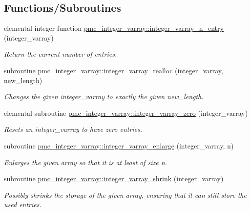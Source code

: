 \subsection*{Functions/\+Subroutines}
\begin{DoxyCompactItemize}
\item 
elemental integer function \mbox{\hyperlink{namespacepmc__integer__varray_aac024cead9772e37f130bdc79254cdd5}{pmc\+\_\+integer\+\_\+varray\+::integer\+\_\+varray\+\_\+n\+\_\+entry}} (integer\+\_\+varray)
\begin{DoxyCompactList}\small\item\em Return the current number of entries. \end{DoxyCompactList}\item 
subroutine \mbox{\hyperlink{namespacepmc__integer__varray_a56e39f9ee34a4092a5c32b74b85494bc}{pmc\+\_\+integer\+\_\+varray\+::integer\+\_\+varray\+\_\+realloc}} (integer\+\_\+varray, new\+\_\+length)
\begin{DoxyCompactList}\small\item\em Changes the given integer\+\_\+varray to exactly the given new\+\_\+length. \end{DoxyCompactList}\item 
elemental subroutine \mbox{\hyperlink{namespacepmc__integer__varray_a374e54ec508c92316da539cb8f0d8a0f}{pmc\+\_\+integer\+\_\+varray\+::integer\+\_\+varray\+\_\+zero}} (integer\+\_\+varray)
\begin{DoxyCompactList}\small\item\em Resets an integer\+\_\+varray to have zero entries. \end{DoxyCompactList}\item 
subroutine \mbox{\hyperlink{namespacepmc__integer__varray_af17a55e72739f42ea30171ba6b236309}{pmc\+\_\+integer\+\_\+varray\+::integer\+\_\+varray\+\_\+enlarge}} (integer\+\_\+varray, n)
\begin{DoxyCompactList}\small\item\em Enlarges the given array so that it is at least of size n. \end{DoxyCompactList}\item 
subroutine \mbox{\hyperlink{namespacepmc__integer__varray_a8c78aecfc2429aeca30d230222f69a1e}{pmc\+\_\+integer\+\_\+varray\+::integer\+\_\+varray\+\_\+shrink}} (integer\+\_\+varray)
\begin{DoxyCompactList}\small\item\em Possibly shrinks the storage of the given array, ensuring that it can still store the used entries. \end{DoxyCompactList}\item 

\end{DoxyCompactItemize}
